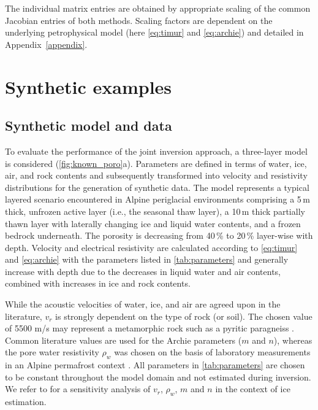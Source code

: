 \documentclass[extra]{gji}
\begin{document}
%
The individual matrix entries are obtained by appropriate scaling of the common Jacobian entries of both methods.
Scaling factors are dependent on the underlying petrophysical model (here \autoref{eq:timur} and \autoref{eq:archie}) and detailed in Appendix~\ref{appendix}.
%

\section{Synthetic examples}
\subsection{Synthetic model and data}
To evaluate the performance of the joint inversion approach, a three-layer model is considered (\autoref{fig:known_poro}a).
Parameters are defined in terms of water, ice, air, and rock contents and subsequently transformed into velocity and resistivity distributions for the generation of synthetic data.
The model represents a typical layered scenario encountered in Alpine periglacial environments comprising a 5\,m thick, unfrozen active layer (i.e., the seasonal thaw layer), a 10\,m thick partially thawn layer with laterally changing ice and liquid water contents, and a frozen bedrock underneath.
The porosity is decreasing from 40\,\% to 20\,\% layer-wise with depth.
Velocity and electrical resistivity are calculated according to \autoref{eq:timur} and \autoref{eq:archie} with the parameters listed in \autoref{tab:parameters} and generally increase with depth due to the decreases in liquid water and air contents, combined with increases in ice and rock contents.

While the acoustic velocities of water, ice, and air are agreed upon in the literature, $v_r$ is strongly dependent on the type of rock (or soil).
The chosen value of 5500 m/s may represent a metamorphic rock such as a pyritic paragneiss \citep[e.g.,][]{Draebing2012}.
Common literature values are used for the Archie parameters ($m$ and $n$), whereas the pore water resistivity $\rho_w$ was chosen on the basis of laboratory measurements in an Alpine permafrost context \citep[e.g.,][]{Hauck2008}.
All parameters in \autoref{tab:parameters} are chosen to be constant throughout the model domain and not estimated during inversion.
We refer to \cite{Hauck2011} for a sensitivity analysis of $v_r$, $\rho_w$, $m$ and $n$ in the context of ice estimation.
\end{document}
